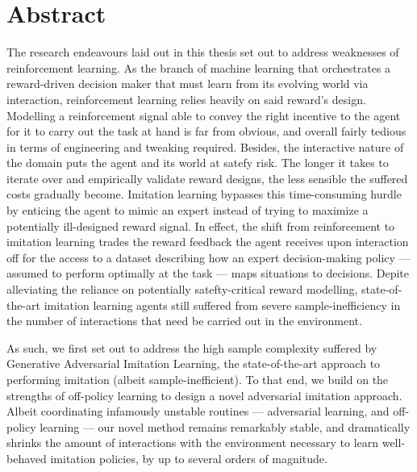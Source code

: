 

\thispagestyle{empty}
\chapter*{Abstract}

The research endeavours laid out in this thesis set out to
address weaknesses of reinforcement learning.
As the branch of machine learning that orchestrates a
reward-driven decision maker that must learn from its evolving world
via interaction, reinforcement learning relies heavily on said reward's design.
Modelling a reinforcement signal able to convey the right incentive to the agent
for it to carry out the task at hand is far from obvious, and overall fairly tedious
in terms of engineering and tweaking required.
Besides, the interactive nature of the domain puts the agent and its world at satefy risk.
The longer it takes to iterate over and empirically validate reward designs,
the less sensible the suffered costs gradually become.
Imitation learning bypasses this time-consuming hurdle by enticing the agent to mimic an expert
instead of trying to maximize a potentially ill-designed reward signal.
In effect, the shift from reinforcement to imitation learning trades the reward feedback the
agent receives upon interaction off for the access to
a dataset describing how an expert decision-making policy
--- assumed to perform optimally at the task --- maps situations to decisions.
Depite alleviating the reliance on potentially satefty-critical reward modelling,
state-of-the-art imitation learning agents still suffered from severe sample-inefficiency in the
number of interactions that need be carried out in the environment.

As such, we first set out to address the high sample complexity
suffered by Generative Adversarial Imitation Learning, the state-of-the-art approach
to performing imitation (albeit sample-inefficient).
To that end, we build on the strengths of off-policy learning
to design a novel adversarial imitation approach.
Albeit coordinating infamously unstable routines --- adversarial learning, and off-policy learning ---
our novel method remains remarkably stable, and dramatically shrinks the amount of interactions with the
environment necessary to learn well-behaved imitation policies,
by up to several orders of magnitude.

